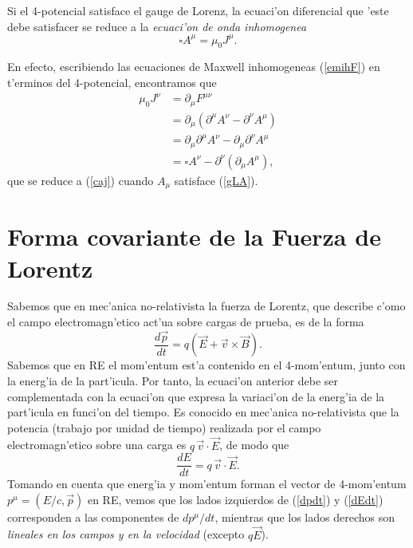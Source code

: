 Si el 4-potencial satisface el gauge de Lorenz, la ecuaci'on diferencial que 'este debe satisfacer se reduce a la \textit{ecuaci'on de onda inhomogenea}
\begin{equation}
\boxed{\square A^\mu=\mu_0 J^\mu .} \label{caj}
\end{equation}

En efecto, escribiendo las ecuaciones de Maxwell inhomogeneas (\ref{emihF}) en t'erminos del 4-potencial, encontramos que
\begin{align}
\mu_0 J^\nu &=\partial_\mu F^{\mu\nu}  \\
&=\partial_\mu \left(  \partial^\mu A^\nu -\partial^\nu A^\mu \right)  \\
&= \partial_\mu \partial^\mu A^\nu -\partial_\mu \partial^\nu A^\mu   \\
&= \square A^\nu -\partial^\nu (\partial_\mu A^\mu)   ,
\end{align}
que se reduce a (\ref{caj}) cuando $A_\mu$ satisface (\ref{gLA}).

\section{Forma covariante de la Fuerza de Lorentz}
Sabemos que en mec'anica no-relativista la fuerza de Lorentz, que describe c'omo el campo electromagn'etico act'ua sobre cargas de prueba, es de la forma
\begin{equation}
\frac{d\vec{p}}{dt}=q\left(  \vec{E}+\vec{v}\times\vec{B}\right).
\label{dpdt}
\end{equation}
Sabemos que en RE el mom'entum est'a contenido en el 4-mom'entum, junto con la
energ'ia de la part'icula. Por tanto, la ecuaci'on anterior debe ser
complementada con la ecuaci'on que expresa la variaci'on de la energ'ia de la
part'icula en funci'on del tiempo. Es conocido en mec'anica no-relativista que
la potencia (trabajo por unidad de tiempo) realizada por el campo
electromagn'etico sobre una carga es $q\,\vec{v}\cdot\vec{E}$, de modo que
\begin{equation}
\frac{dE}{dt}=q\,\vec{v}\cdot\vec{E}. \label{dEdt}
\end{equation}
Tomando en cuenta que energ'ia y mom'entum forman el vector de 4-mom'entum $p^\mu=({E}/{c},\vec{p})$ en RE, vemos que los lados
izquierdos de (\ref{dpdt}) y (\ref{dEdt}) corresponden a las componentes de
${dp^\mu}/{dt}$, mientras que los lados derechos son \textit{lineales en los campos y en la velocidad} (excepto $q\vec{E}$).

